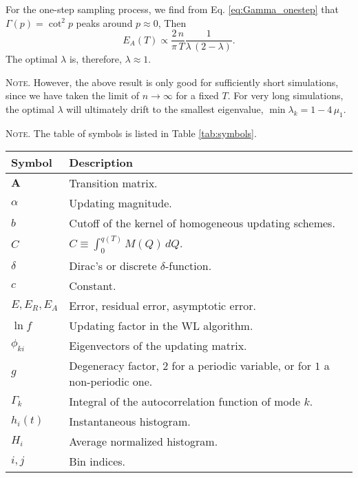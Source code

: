 \documentclass[reprint, superscriptaddress, floatfix]{revtex4-1}
\newcommand{\note}[1]{{\color{DarkGreen}\footnotesize \textsc{Note.} #1}}
\newcommand{\Err}{E}
\begin{document}
For the one-step sampling process,
we find from Eq. \eqref{eq:Gamma_onestep}
that $\Gamma(p) = \cot^2 p$
peaks around $p \approx 0$,
%
Then
$$
  \Err_A(T)
  \propto
  \frac{   2 \, n }
       { \pi \, T }
  \frac{             1             }
       {  \lambda \, (2 - \lambda) }
  .
$$
%
The optimal $\lambda$ is, therefore,
$\lambda \approx 1$.
%

\note{
However, the above result %
is only good
for sufficiently short simulations,
since we have taken the limit of $n \to \infty$
for a fixed $T$.
%
For very long simulations,
the optimal $\lambda$
will ultimately drift to
the smallest eigenvalue,
$\min \lambda_k = 1 - 4 \, \mu_1$.
}


\note{The table of symbols is listed in Table \ref{tab:symbols}.
  \begin{table*}
  \footnotesize
  \centering
  \rowcolors{1}{white}{LightGray}
  \setlength{\tabcolsep}{4pt} %
  \caption{\label{tab:symbols}Table of symbols.}
  \begin{tabular}{l | p{12cm} }
    Symbol          &   Description \\
    \hline
    $\mathbf{A}$    &   Transition matrix. \\
    $\alpha$        &   Updating magnitude. \\
    $b$             &   Cutoff of the kernel of homogeneous updating schemes. \\
    $C$             &   $C \equiv \int_0^{ q(T) } M(Q) \, dQ$.  \\
    $\delta$        &   Dirac's or discrete $\delta$-function. \\
    $c$             &   Constant. \\
    $\Err, \Err_R, \Err_A$          &   Error, residual error, asymptotic error. \\
    $\ln f$         &   Updating factor in the WL algorithm.  \\
    $\phi_{ki}$     &   Eigenvectors of the updating matrix. \\
    $g$             &   Degeneracy factor, $2$ for a periodic variable, or for $1$ a non-periodic one. \\
    $\Gamma_k$      &   Integral of the autocorrelation function of mode $k$. \\
    $h_i(t)$        &   Instantaneous histogram.  \\
    $H_i$           &   Average normalized histogram.  \\
    $i, j$          &   Bin indices. \\

\end{tabular}
\end{table*}}
\end{document}
